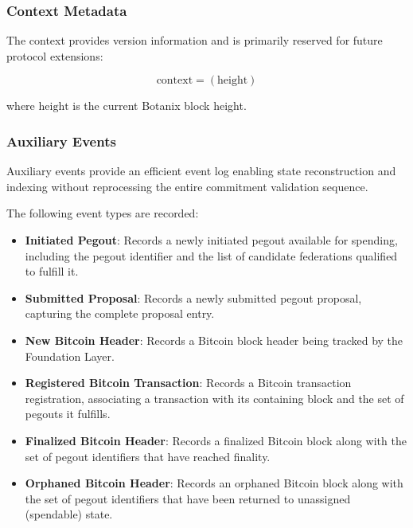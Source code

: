 \subsubsection{Context Metadata}
\label{sec:foundation-context-metadata}

The context provides version information and is primarily reserved for future protocol extensions:

\begin{equation}
    \text{context} = (\text{height})
\end{equation}

where $\text{height}$ is the current Botanix block height.

\subsubsection{Auxiliary Events}
\label{sec:foundation-aux-events}

Auxiliary events provide an efficient event log enabling state reconstruction and indexing without reprocessing the entire commitment validation sequence.

The following event types are recorded:

\begin{itemize}
    \item \textbf{Initiated Pegout}: Records a newly initiated pegout available for spending, including the pegout identifier and the list of candidate federations qualified to fulfill it.
    \item \textbf{Submitted Proposal}: Records a newly submitted pegout proposal, capturing the complete proposal entry.
    \item \textbf{New Bitcoin Header}: Records a Bitcoin block header being tracked by the Foundation Layer.
    \item \textbf{Registered Bitcoin Transaction}: Records a Bitcoin transaction registration, associating a transaction with its containing block and the set of pegouts it fulfills.
    \item \textbf{Finalized Bitcoin Header}: Records a finalized Bitcoin block along with the set of pegout identifiers that have reached finality.
    \item \textbf{Orphaned Bitcoin Header}: Records an orphaned Bitcoin block along with the set of pegout identifiers that have been returned to unassigned (spendable) state.
\end{itemize}
